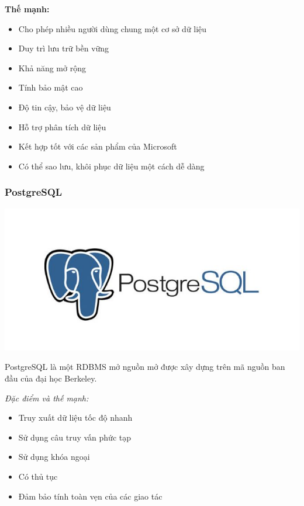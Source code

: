 \textbf{Thế mạnh:}
\begin{itemize}
    \item Cho phép nhiều người dùng chung một cơ sở dữ liệu
    \item Duy trì lưu trữ bền vững
    \item Khả năng mở rộng
    \item Tính bảo mật cao
    \item Độ tin cậy, bảo vệ dữ liệu
    \item Hỗ trợ phân tích dữ liệu
    \item Kết hợp tốt với các sản phẩm của Microsoft
    \item Có thể sao lưu, khôi phục dữ liệu một cách dễ dàng
\end{itemize}

\subsubsection{PostgreSQL}
\begin{center}
  \captionsetup{type=figure}
    \includegraphics[scale=0.5]{image/postgre-sql.jpg}
\end{center}

PostgreSQL là một RDBMS mở nguồn mở được xây dựng trên mã nguồn ban đầu của đại học Berkeley.

\textit{Đặc điểm và thế mạnh:}
\begin{itemize}
    \item Truy xuất dữ liệu tốc độ nhanh
    \item Sử dụng câu truy vấn phức tạp
    \item Sử dụng khóa ngoại
    \item Có thủ tục
    \item Đảm bảo tính toàn vẹn của các giao tác
\end{itemize}

